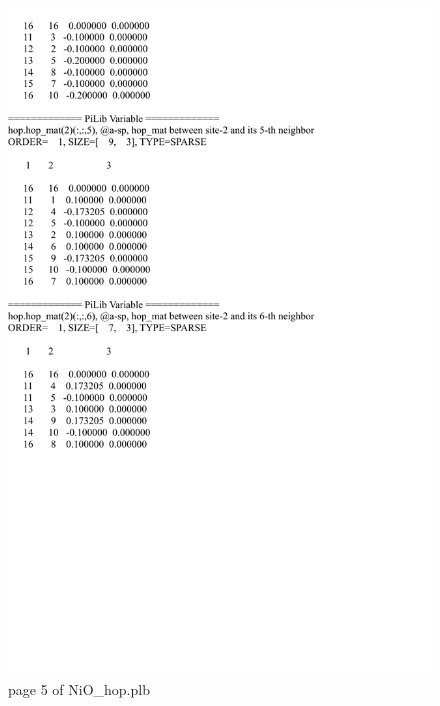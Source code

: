\documentclass[10pt,a4paper]{article}
\begin{document}
\begin{figure}[tbp]
\centering
\includegraphics[width=0.9\columnwidth]{NiO_hop_p5.pdf}
\caption{page 5 of NiO\_hop.plb}
\end{figure}
\end{document}
